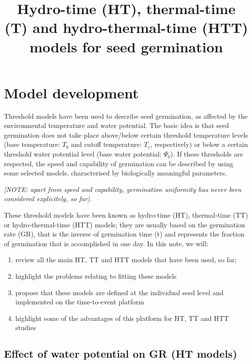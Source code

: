 \documentclass[a4paper,12pt]{article}
\author{}
\date{}
\title{Hydro-time (HT), thermal-time (T) and hydro-thermal-time (HTT) models
for seed germination}
\providecommand{\tightlist}{%
	\setlength{\itemsep}{0pt}\setlength{\parskip}{0pt}}
\begin{document}
\maketitle

\tableofcontents
\section{Model development}\label{model-development}

Threshold models have been used to describe seed germination, as
affected by the environmental temperature and water potential. The basic
idea is that seed germination does not take place above/below certain
threshold temperature levels (base temperature: \(T_b\) and cutoff
temperature: \(T_c\), respectively) or below a certain threshold water
potential level (base water potential: \(\Psi_b\)). If these thresholds
are respected, the speed and capability of germination can be described
by using some selected models, characterised by biologically meaningful
parameters.

\emph{{[}NOTE: apart from speed and capability, germination uniformity
has never been considered explicitely, so far{]}.}

These threshold models have been known as hydro-time (HT), thermal-time
(TT) or hydro-thermal-time (HTT) models; they are usually based on the
germination rate (GR), that is the inverse of germination time (t) and
represents the fraction of germination that is accomplished in one day.
In this note, we will:

\begin{enumerate}
\def\labelenumi{\arabic{enumi}.}
\tightlist
\item
  review all the main HT, TT and HTT models that have been used, so far;
\item
  highlight the problems relating to fitting these models
\item
  propose that these models are defined at the individual seed level and
  implemented on the time-to-event platform
\item
  highlight some of the advantages of this platform for HT, TT and HTT
  studies
\end{enumerate}

\subsection{Effect of water potential on GR (HT
models)}\label{effect-of-water-potential-on-gr-ht-models}
\end{document}
